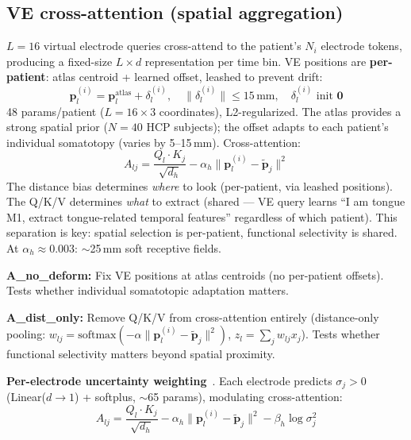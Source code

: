 \documentclass[11pt,letterpaper]{article}
\newcommand{\bfp}{\mathbf{p}}
\begin{document}
\subsection{VE cross-attention (spatial aggregation)}\label{sec:ve-crossattn}

$L{=}16$ virtual electrode queries cross-attend to the patient's $N_i$ electrode tokens, producing a fixed-size $L \times d$ representation per time bin. VE positions are \textbf{per-patient}: atlas centroid + learned offset, leashed to prevent drift:
\begin{equation}
\bfp_l^{(i)} = \bfp_l^{\text{atlas}} + \delta_l^{(i)}, \quad \|\delta_l^{(i)}\| \leq 15\,\text{mm}, \quad \delta_l^{(i)} \text{ init } \mathbf{0}
\end{equation}
48 params/patient ($L{=}16 \times 3$ coordinates), L2-regularized. The atlas provides a strong spatial prior ($N{=}40$ HCP subjects); the offset adapts to each patient's individual somatotopy (varies by 5--15\,mm). Cross-attention:
\begin{equation}
A_{lj} = \frac{Q_l \cdot K_j}{\sqrt{d_h}} - \alpha_h \|\bfp_l^{(i)} - \tilde{\bfp}_j\|^2
\end{equation}
The distance bias determines \textit{where} to look (per-patient, via leashed positions). The Q/K/V determines \textit{what} to extract (shared --- VE query learns ``I am tongue M1, extract tongue-related temporal features'' regardless of which patient). This separation is key: spatial selection is per-patient, functional selectivity is shared. At $\alpha_h \approx 0.003$: ${\sim}$25\,mm soft receptive fields.

\textbf{A\_no\_deform:} Fix VE positions at atlas centroids (no per-patient offsets). Tests whether individual somatotopic adaptation matters.

\textbf{A\_dist\_only:} Remove Q/K/V from cross-attention entirely (distance-only pooling: $w_{lj} = \text{softmax}(-\alpha \|\bfp_l^{(i)} - \tilde{\bfp}_j\|^2)$, $z_l = \sum_j w_{lj} x_j$). Tests whether functional selectivity matters beyond spatial proximity.

\textbf{Per-electrode uncertainty weighting}~\cite{hewitt2024}. Each electrode predicts $\sigma_j > 0$ (Linear($d \to 1$) + softplus, ${\sim}$65 params), modulating cross-attention:
\begin{equation}
A_{lj} = \frac{Q_l \cdot K_j}{\sqrt{d_h}} - \alpha_h \|\bfp_l^{(i)} - \tilde{\bfp}_j\|^2 - \beta_h \log \sigma_j^2
\end{equation}
\end{document}
